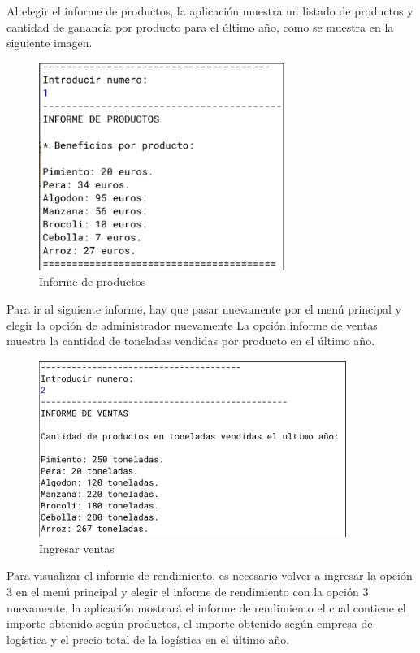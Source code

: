 \documentclass[10pt,a4paper]{article}
\begin{document}
Al elegir el informe de productos, la aplicación muestra un listado de productos y cantidad de ganancia por producto para el último año, como se muestra en la siguiente imagen.

\begin{figure}[H]
  \centerline{
  \includegraphics[width=8cm]{informeProductos.png}
  }
  \captionsetup{justification=centering}
  \caption{Informe de productos\label{fig:opcion1MP} }
\end{figure}

Para ir al siguiente informe, hay que pasar nuevamente por el menú principal y elegir la opción de administrador nuevamente
La opción informe de ventas muestra la cantidad de toneladas vendidas por producto en el último año.

\begin{figure}[H]
  \centerline{
  \includegraphics[width=10cm]{informeVentas.png}
  }
  \captionsetup{justification=centering}
  \caption{Ingresar ventas \label{fig:opcion1MP} }
\end{figure}

Para visualizar el informe de rendimiento, es necesario volver a ingresar la opción 3 en el menú principal y elegir el informe de rendimiento con la opción 3 nuevamente, la aplicación mostrará el informe de rendimiento el cual contiene el importe obtenido según productos, el importe obtenido según empresa de logística y el precio total de la logística en el último año.
\end{document}
